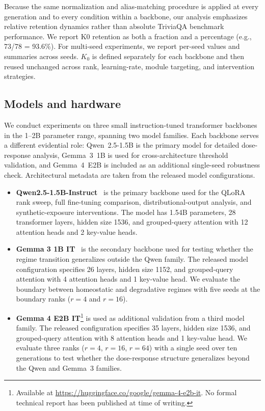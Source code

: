 \documentclass[a4paper,fleqn]{cas-dc}
\begin{document}
Because the same normalization and alias-matching procedure is applied at every
generation and to every condition within a backbone, our analysis emphasizes
relative retention dynamics rather than absolute TriviaQA benchmark performance.
We report K0 retention as both a fraction and a percentage (e.g.,
73/78 = 93.6\%). For multi-seed experiments, we report per-seed values and
summaries across seeds. $K_0$ is defined separately
for each backbone and then reused unchanged across rank, learning-rate, module
targeting, and intervention strategies.

\subsection{Models and hardware}\label{sec:models}

We conduct experiments on three small instruction-tuned transformer backbones in
the 1--2B parameter range, spanning two model families. Each backbone serves a
different evidential role: Qwen~2.5-1.5B is the primary model for detailed
dose-response analysis, Gemma~3~1B is used for cross-architecture threshold
validation, and Gemma~4~E2B is included as an additional single-seed robustness
check. Architectural metadata are taken from the released model configurations.

\begin{itemize}
    \item \textbf{Qwen2.5-1.5B-Instruct}~\citep{qwen2024} is the primary
    backbone used for the QLoRA rank sweep, full fine-tuning comparison,
    distributional-output analysis, and synthetic-exposure interventions. The
    model has 1.54B parameters, 28 transformer layers, hidden size 1536, and
    grouped-query attention with 12 attention heads and 2 key-value heads.

    \item \textbf{Gemma 3 1B IT}~\citep{gemma2025} is the secondary backbone
    used for testing whether the regime transition generalizes outside the Qwen
    family. The released model configuration specifies 26 layers, hidden size
    1152, and grouped-query attention with 4 attention heads and 1 key-value
    head. We evaluate the boundary between homeostatic and degradative regimes
    with five seeds at the boundary ranks ($r=4$ and $r=16$).

    \item \textbf{Gemma 4 E2B IT}\footnote{Available at
    \url{https://huggingface.co/google/gemma-4-e2b-it}. No formal technical
    report has been published at time of writing.} is used as additional
    validation from a third model family. The released configuration specifies
    35 layers, hidden size 1536, and grouped-query attention with 8 attention
    heads and 1 key-value head. We evaluate three ranks ($r=4$,
    $r=16$, $r=64$) with a single seed over ten generations to test whether
    the dose-response structure generalizes beyond the Qwen and Gemma~3
    families.
\end{itemize}
\end{document}
